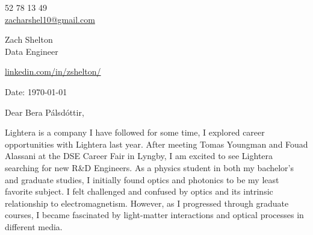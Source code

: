 \documentclass[11pt,a4]{article}
\begin{document}
\begin{center}
    \begin{minipage}[b]{0.24\textwidth}
            \large 52 78 13 49 \\
            \large \href{mailto:zshelton1997@gmail.com}{zacharshel10@gmail.com} 
    \end{minipage}%
    \begin{minipage}[b]{0.5\textwidth}
            \centering
            {\Huge Zach Shelton} \\ %
            \vspace{0.1cm}
            {\color{UI_blue} \Large{Data Engineer}} \\
    \end{minipage}%
    \begin{minipage}[b]{0.24\textwidth}
            \flushright \large
            {\href{https://www.linkedin.com/in/zshelton/}{linkedin.com/in/zshelton/} } \\

    \end{minipage}   
    
\vspace{-0.15cm} 
{\color{UI_blue} \hrulefill}
\end{center}

\justify
\setlength{\parindent}{0pt}
\setlength{\parskip}{12pt}
\vspace{0.1cm}


Date: \today \par \vspace{-0.1cm}

Dear Bera Pálsdóttir,

Lightera is a company I have followed for some time, I explored career opportunities with Lightera last year. After meeting Tomas Youngman and Fouad Alassani at the DSE Career Fair in Lyngby, I am excited to see Lightera searching for new R\&D Engineers. As a physics student in both my bachelor's and graduate studies, I initially found optics and photonics to be my least favorite subject. I felt challenged and confused by optics and its intrinsic relationship to electromagnetism. However, as I progressed through graduate courses, I became fascinated by light-matter interactions and optical processes in different media.
\end{document}
